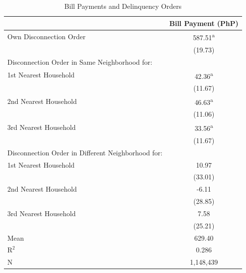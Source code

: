 \documentclass[12pt]{article}
\begin{document}
\begin{table}[!ht]
\small
\centering
\begin{threeparttable}
\caption{Bill Payments and Delinquency Orders}\label{table:paywarning}
\vspace{-2mm}
\begin{tabular}{lc}
\toprule
 & \small Bill Payment (PhP) \\[.5em]
 \toprule
Own Disconnection Order         &      587.51\textsuperscript{a}\\
                    &     (19.73)                   \\[0.5em]
Disconnection Order in Same Neighborhood for: \\[.5em] \hspace{.5em}1st Nearest Household&       42.36\textsuperscript{a}\\
                    &     (11.67)                   \\[0.1em]
\hspace{.5em}2nd Nearest Household&       46.63\textsuperscript{a}\\
                    &     (11.06)                   \\[0.1em]
\hspace{.5em}3rd Nearest Household&       33.56\textsuperscript{a}\\
                    &     (11.67)                   \\[0.1em]
Disconnection Order in Different Neighborhood for:  \\[.5em] \hspace{.5em}1st Nearest Household&       10.97                   \\
                    &     (33.01)                   \\[0.1em]
\hspace{.5em}2nd Nearest Household&       -6.11                   \\
                    &     (28.85)                   \\[0.1em]
\hspace{.5em}3rd Nearest Household&        7.58                   \\
                    &     (25.21)                   \\[0.1em]
Mean                &      629.40                   \\
$\text{R}^{2}$      &       0.286                   \\
N                   &   1,148,439                   \\

\end{tabular}
\end{threeparttable}
\end{table}
\end{document}
